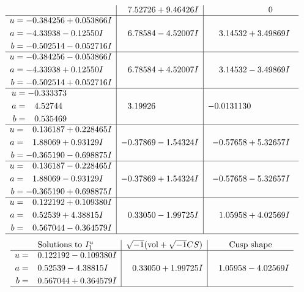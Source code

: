 \documentclass[1p]{elsarticle_modified}
\theoremstyle{definition}
\newcommand{\I}{\sqrt{-1}}
\begin{document}
$$\begin{array}{c|c|c}
 & \phantom{-}7.52726 + 9.46426 I & \phantom{-0.000000 } 0 \\ \hline\begin{aligned}
u &= -0.384256 + 0.053866 I \\
a &= -4.33938 - 0.12550 I \\
b &= -0.502514 - 0.052716 I\end{aligned}
 & \phantom{-}6.78584 - 4.52007 I & \phantom{-}3.14532 + 3.49869 I \\ \hline\begin{aligned}
u &= -0.384256 - 0.053866 I \\
a &= -4.33938 + 0.12550 I \\
b &= -0.502514 + 0.052716 I\end{aligned}
 & \phantom{-}6.78584 + 4.52007 I & \phantom{-}3.14532 - 3.49869 I \\ \hline\begin{aligned}
u &= -0.333373\phantom{ +0.000000I} \\
a &= \phantom{-}4.52744\phantom{ +0.000000I} \\
b &= \phantom{-}0.535469\phantom{ +0.000000I}\end{aligned}
 & \phantom{-}3.19926\phantom{ +0.000000I} & -0.0131130\phantom{ +0.000000I} \\ \hline\begin{aligned}
u &= \phantom{-}0.136187 + 0.228465 I \\
a &= \phantom{-}1.88069 + 0.93129 I \\
b &= -0.365190 - 0.698875 I\end{aligned}
 & -0.37869 - 1.54324 I & -0.57658 + 5.32657 I \\ \hline\begin{aligned}
u &= \phantom{-}0.136187 - 0.228465 I \\
a &= \phantom{-}1.88069 - 0.93129 I \\
b &= -0.365190 + 0.698875 I\end{aligned}
 & -0.37869 + 1.54324 I & -0.57658 - 5.32657 I \\ \hline\begin{aligned}
u &= \phantom{-}0.122192 + 0.109380 I \\
a &= \phantom{-}0.52539 + 4.38815 I \\
b &= \phantom{-}0.567044 - 0.364579 I\end{aligned}
 & \phantom{-}0.33050 - 1.99725 I & \phantom{-}1.05958 + 4.02569 I\\
 \hline 
 \end{array}$$\newpage$$\begin{array}{c|c|c}  
\text{Solutions to }I^u_{1}& \I (\text{vol} + \sqrt{-1}CS) & \text{Cusp shape}\\
 \hline 
\begin{aligned}
u &= \phantom{-}0.122192 - 0.109380 I \\
a &= \phantom{-}0.52539 - 4.38815 I \\
b &= \phantom{-}0.567044 + 0.364579 I\end{aligned}
 & \phantom{-}0.33050 + 1.99725 I & \phantom{-}1.05958 - 4.02569 I\\
 \hline 
 \end{array}$$\newpage\newpage\renewcommand{\arraystretch}{1}
\end{document}
